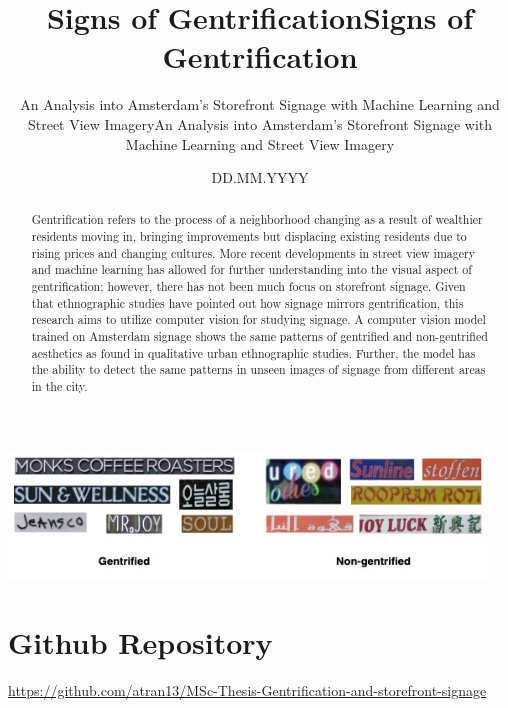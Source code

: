 \documentclass[ds, nofrontpicture, nofirstcompanypicture, nosecondcompanypicture]{mscthesis}
\title{Signs of Gentrification}
\subtitle{An Analysis into Amsterdam's Storefront Signage with Machine Learning and Street View Imagery}
\date{DD.MM.YYYY}
\begin{document}
\pagestyle{plain}
\setcounter{page}{1}

\maketitlepage
\fixemptypage

\title{Signs of Gentrification}
\subtitle{An Analysis into Amsterdam's Storefront Signage with Machine Learning and Street View Imagery}

\begin{abstract}
Gentrification refers to the process of a neighborhood changing as a result of wealthier residents moving in, bringing improvements but displacing existing residents due to rising prices and changing cultures. More recent developments in street view imagery and machine learning has allowed for further understanding into the visual aspect of gentrification; however, there has not been much focus on storefront signage. Given that ethnographic studies have pointed out how signage mirrors gentrification, this research aims to utilize computer vision for studying signage. A computer vision model trained on Amsterdam signage shows the same patterns of gentrified and non-gentrified aesthetics as found in qualitative urban ethnographic studies. Further, the model has the ability to detect the same patterns in unseen images of signage from different areas in the city.
\end{abstract}

\begin{teaserfigure}
    \includegraphics[width=0.95\textwidth]{media/titlepage/output_vis-frontman.jpg}
\end{teaserfigure}

\maketitle

\section*{Github Repository}
\url{https://github.com/atran13/MSc-Thesis-Gentrification-and-storefront-signage}












\newpage

\end{document}
